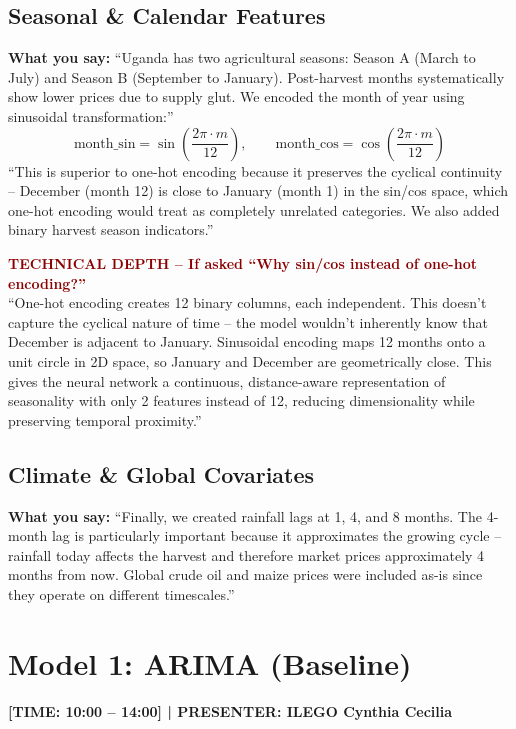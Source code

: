 \documentclass[11pt,a4paper]{article}
\begin{document}
\subsection{Seasonal \& Calendar Features}
\textbf{What you say:}
``Uganda has two agricultural seasons: Season A (March to July) and Season B (September to January). Post-harvest months systematically show lower prices due to supply glut. We encoded the month of year using sinusoidal transformation:''
$$\text{month\_sin} = \sin\left(\frac{2\pi \cdot m}{12}\right), \qquad \text{month\_cos} = \cos\left(\frac{2\pi \cdot m}{12}\right)$$
``This is superior to one-hot encoding because it preserves the cyclical continuity -- December (month 12) is close to January (month 1) in the sin/cos space, which one-hot encoding would treat as completely unrelated categories. We also added binary harvest season indicators.''

\begin{mdframed}[backgroundcolor=red!5, linecolor=darkred]
\textcolor{darkred}{\textbf{TECHNICAL DEPTH -- If asked ``Why sin/cos instead of one-hot encoding?''}}\\
``One-hot encoding creates 12 binary columns, each independent. This doesn't capture the cyclical nature of time -- the model wouldn't inherently know that December is adjacent to January. Sinusoidal encoding maps 12 months onto a unit circle in 2D space, so January and December are geometrically close. This gives the neural network a continuous, distance-aware representation of seasonality with only 2 features instead of 12, reducing dimensionality while preserving temporal proximity.''
\end{mdframed}

\subsection{Climate \& Global Covariates}
\textbf{What you say:}
``Finally, we created rainfall lags at 1, 4, and 8 months. The 4-month lag is particularly important because it approximates the growing cycle -- rainfall today affects the harvest and therefore market prices approximately 4 months from now. Global crude oil and maize prices were included as-is since they operate on different timescales.''

\section{Model 1: ARIMA (Baseline)}
\textcolor{timecolor}{\textbf{[TIME: 10:00 -- 14:00] | PRESENTER: ILEGO Cynthia Cecilia}}
\end{document}
